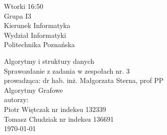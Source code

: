 \documentclass[polish,polish,a4paper]{article}
\begin{document}
	
		\begin{titlepage}
			\begin{flushright}
				{ Wtorki 16:50\\
					Grupa I3\\
					Kierunek Informatyka\\
					Wydział Informatyki\\
					Politechnika Poznańska}
			\end{flushright}
		\vspace*{\fill}
		\begin{center}
			{\Large Algorytmy i struktury danych \\[0.1cm]
				Sprawozdanie z zadania w zespołach nr. 3\\[0.1cm]
				prowadząca: dr hab. inż. Małgorzata Sterna, prof PP}\\
			{\Huge Algorytmy  Grafowe\\ [0.4cm]}
			{\large autorzy:\\[0.1cm]}
			{\large Piotr Więtczak nr indeksu 132339\\[0.1cm] Tomasz Chudziak nr indeksu 136691}\\[0.5cm]
			\today
		\end{center}
		\vspace*{\fill}
	\end{titlepage}
\end{document}
